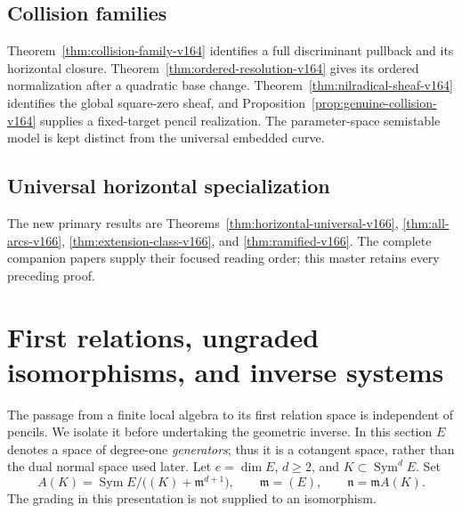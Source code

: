 \documentclass[11pt,reqno]{amsart}
\numberwithin{equation}{section}
\theoremstyle{definition}\newtheorem{definition}[theorem]{Definition}
\theoremstyle{remark}\newtheorem{remark}[theorem]{Remark}
\DeclareMathOperator{\Sym}{Sym}\DeclareMathOperator{\Gr}{Gr}
\begin{document}
\subsection{Collision families}
Theorem~\ref{thm:collision-family-v164} identifies a full discriminant
pullback and its horizontal closure. Theorem~\ref{thm:ordered-resolution-v164}
gives its ordered normalization after a quadratic base change.
Theorem~\ref{thm:nilradical-sheaf-v164} identifies the global square-zero
sheaf, and Proposition~\ref{prop:genuine-collision-v164} supplies a
fixed-target pencil realization. The parameter-space semistable
model is kept distinct from the universal embedded curve.

\subsection{Universal horizontal specialization}
The new primary results are Theorems~\ref{thm:horizontal-universal-v166},
\ref{thm:all-arcs-v166}, \ref{thm:extension-class-v166}, and
\ref{thm:ramified-v166}. The complete companion papers supply their
focused reading order; this master retains every preceding proof.
\section{First relations, ungraded isomorphisms, and inverse systems}
\label{sec:first-relations-v147}

The passage from a finite local algebra to its first relation space is
independent of pencils.  We isolate it before undertaking the geometric
inverse.  In this section \(E\) denotes a space of degree-one
\emph{generators}; thus it is a cotangent space, rather than the dual
normal space used later.  Let \(e=\dim E\), \(d\ge2\), and
\(K\subset\Sym^d E\).  Set
\begin{equation}\label{eq:general-first-algebra-v147}
 A(K)=\Sym E/\bigl((K)+\mathfrak m^{d+1}\bigr),
 \qquad \mathfrak m=(E),\qquad \mathfrak n=\mathfrak m A(K).
\end{equation}
The grading in this presentation is not supplied to an isomorphism.
\end{document}
